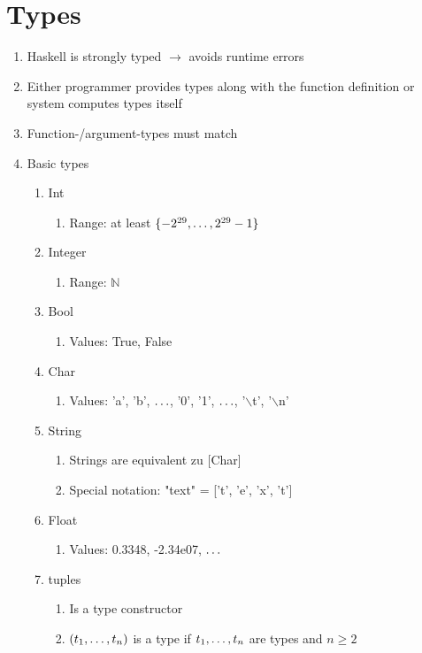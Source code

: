 \documentclass[10pt]{article}
\newcommand{\enumstart}{\begin{enumerate}}
\newcommand{\enumend}{\end{enumerate}}
\newcommand{\N}{\mathbb{N}}
\begin{document}
\section{Types}
\enumstart
	\item Haskell is strongly typed $\rightarrow$ avoids runtime errors
	\item Either programmer provides types along with the function definition or system computes types itself
	\item Function-/argument-types must match
	\item Basic types
	\enumstart
		\item Int
		\enumstart
			\item Range: at least $\{-2^{29}, \mathellipsis, 2^{29}-1\}$
		\enumend
		\item Integer
		\enumstart
			\item Range: $\N$
		\enumend
		\item Bool
		\enumstart
			\item Values: True, False
		\enumend
		\item Char
		\enumstart
			\item Values: 'a', 'b', $\mathellipsis$, '0', '1', $\mathellipsis$, '$\backslash$t', '$\backslash$n'
		\enumend
		\item String
		\enumstart
			\item Strings are equivalent zu [Char]
			\item Special notation: "text" = ['t', 'e', 'x', 't']
		\enumend
		\item Float
		\enumstart
			\item Values: 0.3348, -2.34e07, $\mathellipsis$
		\enumend
		\item tuples
		\enumstart
			\item Is a type constructor
			\item $(t_1, \mathellipsis, t_n)$ is a type if $t_1, \mathellipsis, t_n$ are types and $n \ge 2$
		\enumend
	\enumend
\enumend
\end{document}
